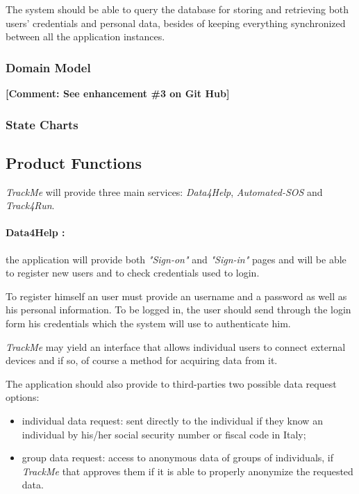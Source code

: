 \documentclass[a4paper]{article}
\newcommand{\comment}[1]{\textbf{[Comment: #1]}}
\begin{document}
    The system should be able to query the database for storing and retrieving both users' credentials and personal data, besides of keeping everything synchronized between all the application instances.
    
    \subsubsection{Domain Model}
    \comment{See enhancement \#3 on Git Hub}
    
    \subsubsection{State Charts}
    
    \subsection{Product Functions}
    \textit{TrackMe} will provide three main services: \textit{Data4Help}, \textit{Automated-SOS} and \textit{Track4Run}.
    
    \paragraph{Data4Help :}
    the application will provide both \textit{"Sign-on"} and \textit{"Sign-in"} pages and will be able to register new users and to check credentials used to login.
    
    To register himself an user must provide an username and a password as well as his personal information. To be logged in, the user should send through the login form his credentials which the system will use to authenticate him.
    
    \textit{TrackMe} may yield an interface that allows individual users to connect external devices and if so, of course a method for acquiring data from it.
    
    The application should also provide to third-parties two possible data request options:
    \begin{itemize}
        \item individual data request: sent directly to the individual if they know an  individual by his/her social security number or fiscal code in Italy;
        \item group data request: access  to  anonymous  data  of  groups  of  individuals, if \textit{TrackMe}  that  approves  them  if  it  is  able  to  properly  anonymize  the  requested  data.
    \end{itemize}
    
\end{document}
